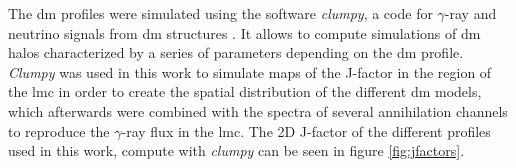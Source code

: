 \documentclass[main.tex]{subfiles}
\begin{document}
\begin{table}
  \centering
    \caption{Parameters of the \gls{dm} profiles used in this work. Values of NFW-mean and Iso-mean profiles are the same as of \cite{2015FermiLMCDM}. The $J$-factors are integrated over 10º from the halo center.} \label{tab:dmprofiles}
\end{table}

The \gls{dm} profiles were simulated using the software \textit{clumpy}, a code for $\gamma$-ray and neutrino signals from \gls{dm} structures \cite{2019CLUMPY}. It allows to compute simulations of \gls{dm} halos characterized by a series of parameters depending on the \gls{dm} profile. \textit{Clumpy} was used in this work to simulate maps of the J-factor in the region of the \gls{lmc} in order to create the spatial distribution of the different \gls{dm} models, which afterwards were combined with the spectra of several annihilation channels to reproduce the $\gamma$-ray flux in the \gls{lmc}. 
The 2D J-factor of the different profiles used in this work, compute with \textit{clumpy} can be seen in figure \ref{fig:jfactors}.
\end{document}
